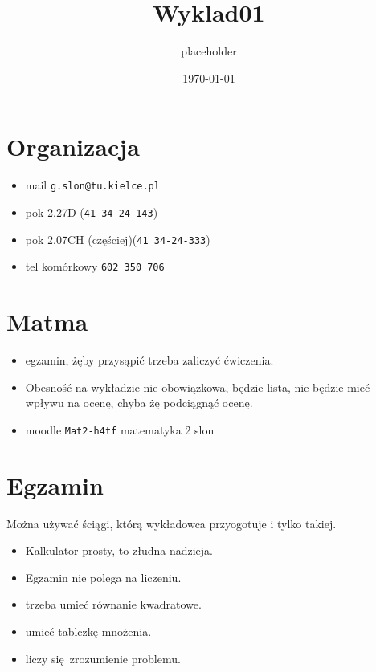 \documentclass[11pt]{article}
\author{placeholder}
\date{\today}
\title{Wyklad01}
\begin{document}
\maketitle
\tableofcontents

\section{Organizacja}
\label{sec:orgf3a3fa2}
\begin{itemize}
\item mail \texttt{g.slon@tu.kielce.pl}
\item pok 2.27D (\texttt{41 34-24-143})
\item pok 2.07CH (częściej)(\texttt{41 34-24-333})
\item tel komórkowy \texttt{602 350 706}
\end{itemize}
\section{Matma}
\label{sec:org12637b1}
\begin{itemize}
\item egzamin, żęby przysąpić trzeba zaliczyć ćwiczenia.
\item Obesność na wykładzie nie obowiązkowa, będzie lista, nie będzie mieć wpływu na ocenę, chyba żę podciągnąć ocenę.
\item moodle \texttt{Mat2-h4tf} matematyka 2 slon
\end{itemize}
\section{Egzamin}
\label{sec:orga5ca280}
Można używać ściągi, którą wykładowca przyogotuje i tylko takiej.
\begin{itemize}
\item Kalkulator prosty, to złudna nadzieja.
\item Egzamin nie polega na liczeniu.
\item trzeba umieć równanie kwadratowe.
\item umieć tablczkę mnożenia.
\item liczy się zrozumienie problemu.
\end{itemize}
\end{document}
